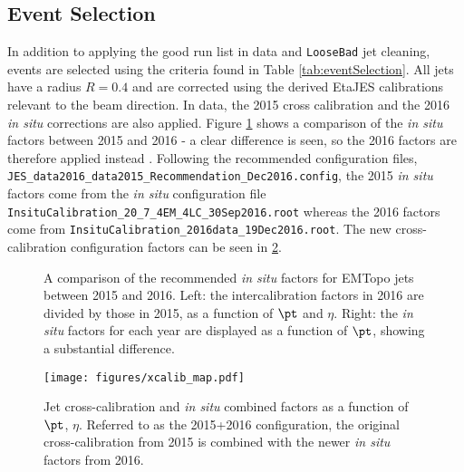 \documentclass[NOTE, atlasdraft=true, texlive=2016, USenglish]{\ATLASLATEXPATH atlasdoc}
\begin{document}
\subsection{Event Selection}
In addition to applying the good run list in data and \texttt{LooseBad} jet cleaning, events are selected using the criteria found in Table \ref{tab:eventSelection}. All jets have a radius $R=0.4$ and are corrected using the derived EtaJES calibrations relevant to the beam direction. In data, the 2015 cross calibration and the 2016 \textit{in situ} corrections are also applied. Figure \ref{fig:insituComp} shows a comparison of the \textit{in situ} factors between 2015 and 2016 - a clear difference is seen, so the 2016 factors are therefore applied instead \cite{ATLAS-CONF-2015-017}. Following the recommended configuration files, \texttt{JES\_data2016\_data2015\_Recommendation\_Dec2016.config}, the 2015 \textit{in situ} factors come from the \textit{in situ} configuration file \texttt{InsituCalibration\_20\_7\_4EM\_4LC\_30Sep2016.root} whereas the 2016 factors come from \texttt{InsituCalibration\_2016data\_19Dec2016.root}. The new cross-calibration configuration factors can be seen in \ref{fig:newXCalib}.
\begin{figure}[htbp]
	\centering
	\caption{A comparison of the recommended \textit{in situ} factors for EMTopo jets between 2015 and 2016. Left: the intercalibration factors in 2016 are divided by those in 2015, as a function of $\pt$ and $\eta$. Right: the \textit{in situ} factors for each year are displayed as a function of $\pt$, showing a substantial difference.}
	\label{fig:insituComp}
\end{figure}
\begin{figure}[htbp]
	\centering
	\texttt{[image: figures/xcalib\_map.pdf]}
	\caption{Jet cross-calibration and \textit{in situ} combined factors as a function of $\pt$, $\eta$. Referred to as the 2015+2016 configuration, the original cross-calibration from 2015 is combined with the newer \textit{in situ} factors from 2016.}
	\label{fig:newXCalib}
\end{figure}
\end{document}
